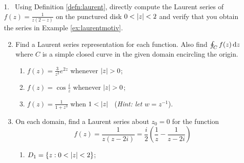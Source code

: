\begin{exercises*}\hangindent\leftmargini
\textup{1.} \ Using Definition \ref{defn:laurent}, directly compute the Laurent series of $f(z)=\frac 1{z(2-z)}$ on the punctured disk $0<\left| z\right|<2$ and verify that you obtain the series in  Example \ref{ex:laurentmotiv}. 


\begin{enumerate}\setcounter{enumi}{1}
  \item Find a Laurent series representation for each function. Also find $\oint_Cf(z)\,{\mathrm{d} z}$ where $C$ is a simple closed curve in the given domain encircling the origin.
  \begin{enumerate}
    \item $f(z)=\frac 3{z^2}e^{2z}$ whenever $\nm z>0$;
    
    \item $f(z)=\cos\frac iz$ whenever $\nm z>0$;
    
    \item $f(z)=\frac 1{1+z^3}$ when $1<\left| z\right|$ \ (\emph{Hint: let $w=z^{-1}$}).
  \end{enumerate}
  
  \item On each domain, find a Laurent series about $z_0=0$ for the function
  \[f(z)=\frac{1}{z(z-2i)}=\frac i2\left(\frac 1z-\frac 1{z-2i}\right)\]
  \begin{enumerate}
    \item $D_1=\{z:0<\left| z\right|<2\}$;
		

\end{enumerate}
\end{enumerate}
\end{exercises*}
